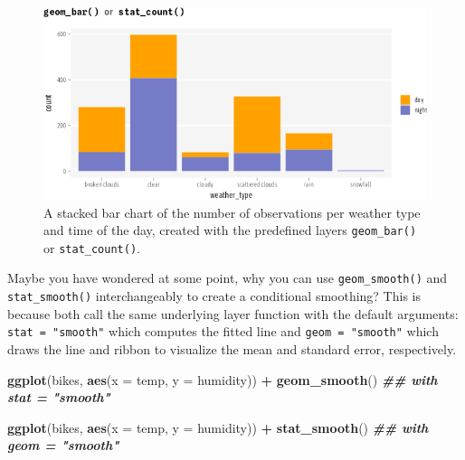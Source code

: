 \documentclass[
]{krantz}
\makeatletter
\newenvironment{Shaded}{\begin{snugshade}}{\end{snugshade}}
\newcommand{\AttributeTok}[1]{\textcolor[rgb]{0.27,0.27,0.27}{#1}}
\newcommand{\DocumentationTok}[1]{\textcolor[rgb]{0.37,0.37,0.37}{\textbf{\textit{#1}}}}
\newcommand{\FunctionTok}[1]{\textcolor[rgb]{0.27,0.27,0.27}{\textbf{#1}}}
\newcommand{\NormalTok}[1]{#1}
\newcommand{\SpecialCharTok}[1]{\textcolor[rgb]{0.43,0.43,0.43}{\textbf{#1}}}
\newenvironment{kframe}{%
\medskip{}
\setlength{\fboxsep}{.8em}
 \def\at@end@of@kframe{}%
 \ifinner\ifhmode%
  \def\at@end@of@kframe{\end{minipage}}%
  \begin{minipage}{\columnwidth}%
 \fi\fi%
 \def\FrameCommand##1{\hskip\@totalleftmargin \hskip-\fboxsep
 \colorbox{shadecolor}{##1}\hskip-\fboxsep
     \hskip-\linewidth \hskip-\@totalleftmargin \hskip\columnwidth}%
 \MakeFramed {\advance\hsize-\width
   \@totalleftmargin\z@ \linewidth\hsize
   \@setminipage}}%
 {\par\unskip\endMakeFramed%
 \at@end@of@kframe}
\renewenvironment{Shaded}{\begin{kframe}}{\end{kframe}}
\makeatother
\begin{document}
\begin{figure}
\centering
\includegraphics{bookdown_files/figure-latex/07layerPredefinedDefaultBars-1.png}
\caption{\label{fig:07layerPredefinedDefaultBars}A stacked bar chart of the number of observations per weather type and time of the day, created with the predefined layers \texttt{geom\_bar()} or \texttt{stat\_count()}.}
\end{figure}

Maybe you have wondered at some point, why you can use \texttt{geom\_smooth()} and \texttt{stat\_smooth()} interchangeably to create a conditional smoothing? This is because both call the same underlying layer function with the default arguments: \texttt{stat\ =\ "smooth"} which computes the fitted line and \texttt{geom\ =\ "smooth"} which draws the line and ribbon to visualize the mean and standard error, respectively.

\begin{Shaded}
\begin{Highlighting}[]
\FunctionTok{ggplot}\NormalTok{(bikes, }\FunctionTok{aes}\NormalTok{(}\AttributeTok{x =}\NormalTok{ temp, }\AttributeTok{y =}\NormalTok{ humidity)) }\SpecialCharTok{+} 
  \FunctionTok{geom\_smooth}\NormalTok{() }\DocumentationTok{\#\# with \textasciigrave{}stat = "smooth"\textasciigrave{}}

\FunctionTok{ggplot}\NormalTok{(bikes, }\FunctionTok{aes}\NormalTok{(}\AttributeTok{x =}\NormalTok{ temp, }\AttributeTok{y =}\NormalTok{ humidity)) }\SpecialCharTok{+} 
  \FunctionTok{stat\_smooth}\NormalTok{() }\DocumentationTok{\#\# with \textasciigrave{}geom = "smooth"\textasciigrave{}}
\end{Highlighting}
\end{Shaded}
\end{document}
